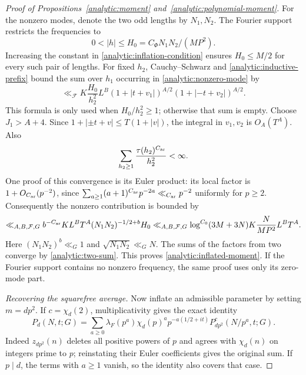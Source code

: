 \begin{proof}[Proof of Propositions~\ref{analytic:moment} and~\ref{analytic:polynomial-moment}]
For the nonzero modes, denote the two odd lengths by $N_1,N_2$.
The Fourier support restricts the frequencies to
\[
 0<|h|\leq H_0=C_\Phi N_1N_2/(MP^2).
\]
Increasing the constant in \eqref{analytic:inflation-condition}
ensures $H_0\leq M/2$ for every such pair of lengths. For fixed
$h_2$, Cauchy--Schwarz and \eqref{analytic:inductive-prefix} bound
the sum over $h_1$ occurring in \eqref{analytic:nonzero-mode} by
\[
 \ll_{\mathcal F}K\frac{H_0}{h_2^2}L^B
 (1+|t+v_1|)^{A/2}(1+|-t+v_2|)^{A/2}.
\]
This formula is only used when $H_0/h_2^2\geq1$; otherwise that sum
is empty. Choose $J_1>A+4$. Since
$1+|\pm t+v|\leq T(1+|v|)$, the integral in $v_1,v_2$ is
$O_A(T^A)$. Also
\begin{equation}\label{analytic:square-factor-sum}
 \sum_{h_2\geq1}\frac{\tau(h_2)^{C_{\rm ar}}}{h_2^2}<\infty.
\end{equation}
One proof of this convergence is its Euler product: its local factor
is $1+O_{C_{\rm ar}}(p^{-2})$, since
$\sum_{a\geq1}(a+1)^{C_{\rm ar}}p^{-2a}
\ll_{C_{\rm ar}}p^{-2}$ uniformly for $p\geq2$.
Consequently the nonzero contribution is bounded by
\[
 \ll_{A,B,\mathcal F,G}b^{-C_{\rm ar}}KL^BT^A
 (N_1N_2)^{-1/2+b}H_0
 \ll_{A,B,\mathcal F,G}
 \log^{C_0}(3M+3N)K\frac{N}{MP^2}L^BT^A.
\]
Here $(N_1N_2)^b\ll_G1$ and
$\sqrt{N_1N_2}\ll_GN$. The sums of the factors from two converge by
\eqref{analytic:two-sum}. This proves
\eqref{analytic:inflated-moment}. If the Fourier support contains no
nonzero frequency, the same proof uses only its zero-mode part.

\smallskip
\noindent\emph{Recovering the squarefree average.}
Now inflate an admissible parameter by setting $m=dp^2$. If
$c=\chi_d(2)$, multiplicativity gives the exact identity
\begin{equation}\label{analytic:inflation-identity}
 P_d(N,t;G)=\sum_{a\geq0}
 \lambda_F(p^a)\chi_d(p)^a p^{-a(1/2+it)}
 P_{dp^2}^c(N/p^a,t;G).
\end{equation}
Indeed $z_{dp^2}(n)$ deletes all positive powers of $p$ and agrees
with $\chi_d(n)$ on integers prime to $p$; reinstating their Euler
coefficients gives the original sum. If $p\mid d$, the terms with
$a\geq1$ vanish, so the identity also covers that case.


\end{proof}
